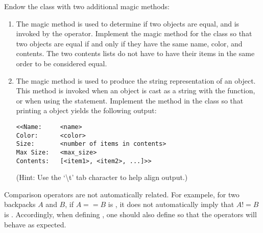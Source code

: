 \begin{problem}
Endow the  class with two additional magic methods:
\begin{enumerate}
\item The  magic method is used to determine if two objects are equal, and is invoked by the \li{==} operator.
Implement the  magic method for the  class so that two  objects are equal if and only if they have the same name, color, and contents.
The two contents lists do not have to have their items in the same order to be considered equal.

\item The  magic method is used to produce the string representation of an object.
This method is invoked when an object is cast as a string with the  function, or when using the  statement.
Implement the  method in the  class so that printing a  object yields the following output:
\begin{lstlisting}
<<Name:		<name>
Color:		<color>
Size:       <number of items in contents>
Max Size:   <max_size>
Contents:   [<item1>, <item2>, ...]>>
\end{lstlisting}
(Hint: Use the `\textbackslash{t}' tab character to help align output.)
\end{enumerate}
\end{problem}

\begin{warn}
Comparison operators are not automatically related.
For exampele, for two backpacks $A$ and $B$, if $A==B$ is , it does not automatically imply that $A!=B$ is .
Accordingly, when defining , one should also define  so that the operators will behave as expected.
\end{warn}

